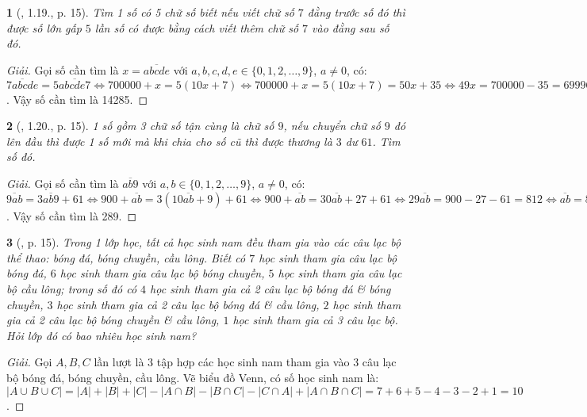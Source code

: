 \documentclass{article}
\newtheorem{baitoan}{}
\begin{document}
\begin{baitoan}[\cite{Binh_boi_duong_Toan_6_tap_1}, 1.19., p. 15]
	Tìm 1 số có 5 chữ số biết nếu viết chữ số $7$ đằng trước số đó thì được số lớn gấp $5$ lần số có được bằng cách viết thêm chữ số $7$ vào đằng sau số đó.
\end{baitoan}

\begin{proof}[Giải]
	Gọi số cần tìm là $x = \overline{abcde}$ với $a,b,c,d,e\in\{0,1,2,\ldots,9\}$, $a\ne0$, có: $\overline{7abcde} = 5\overline{abcde7}\Leftrightarrow700000 + x = 5(10x + 7)\Leftrightarrow700000 + x = 5(10x + 7) = 50x  + 35\Leftrightarrow49x = 700000 - 35 = 699965\Leftrightarrow x = 699965:49 = 14285$. Vậy số cần tìm là 14285.
\end{proof}

\begin{baitoan}[\cite{Binh_boi_duong_Toan_6_tap_1}, 1.20., p. 15]
	1 số gồm 3 chữ số tận cùng là chữ số $9$, nếu chuyển chữ số $9$ đó lên đầu thì được 1 số mới mà khi chia cho số cũ thì được thương là $3$ dư $61$. Tìm số đó.
\end{baitoan}

\begin{proof}[Giải]
	Gọi số cần tìm là $\overline{ab9}$ với $a,b\in\{0,1,2,\ldots,9\}$, $a\ne0$, có: $\overline{9ab} = 3\overline{ab9} + 61\Leftrightarrow900 + \overline{ab} = 3(10\overline{ab} + 9) + 61\Leftrightarrow900 + \overline{ab} = 30\overline{ab} + 27 + 61\Leftrightarrow29\overline{ab} = 900 - 27 - 61 = 812\Leftrightarrow\overline{ab} = 812:29 = 28$. Vậy số cần tìm là 289.
\end{proof}

\begin{baitoan}[\cite{Binh_boi_duong_Toan_6_tap_1}, p. 15]
	Trong 1 lớp học, tất cả học sinh nam đều tham gia vào các câu lạc bộ thể thao: bóng đá, bóng chuyền, cầu lông. Biết có $7$ học sinh tham gia câu lạc bộ bóng đá, $6$ học sinh tham gia câu lạc bộ bóng chuyền, $5$ học sinh tham gia câu lạc bộ cầu lông; trong số đó có $4$ học sinh tham gia cả 2 câu lạc bộ bóng đá \& bóng chuyền, $3$ học sinh tham gia cả 2 câu lạc bộ bóng đá \& cầu lông, $2$ học sinh tham gia cả 2 câu lạc bộ bóng chuyền \& cầu lông, $1$ học sinh tham gia cả 3 câu lạc bộ. Hỏi lớp đó có bao nhiêu học sinh nam?
\end{baitoan}

\begin{proof}[Giải]
	Gọi $A,B,C$ lần lượt là 3 tập hợp các học sinh nam tham gia vào 3 câu lạc bộ bóng đá, bóng chuyền, cầu lông. Vẽ biểu đồ Venn, có số học sinh nam là: $|A\cup B\cup C| = |A| + |B| + |C| - |A\cap B| - |B\cap C| - |C\cap A| + |A\cap B\cap C| = 7 + 6 + 5 - 4 - 3 - 2 + 1 = 10$.
\end{proof}
\end{document}
